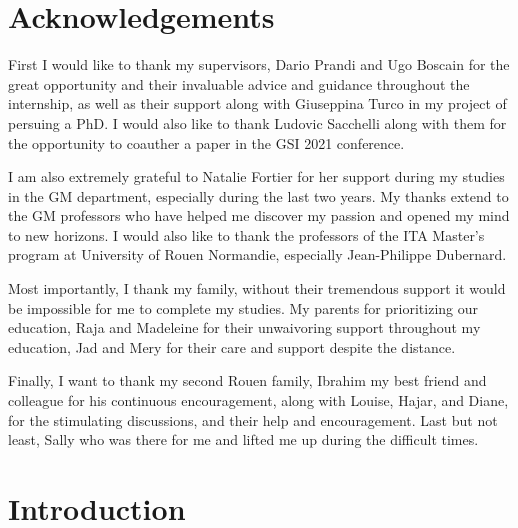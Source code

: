 \documentclass[american,]{article}
\theoremstyle{definition}
\theoremstyle{definition}
\theoremstyle{definition}
\theoremstyle{remark}
\begin{document}
\def\Aut{\mathrm{Aut}}

\def\qtext#1{\quad\text{#1}\quad}

\def\argmin{\mathop{\mathrm{argmin}}}
\def\argmax{\mathop{\mathrm{argmax}}}
\def\supp{\mathop{\mathrm{supp}}}

\def\transp#1{{#1}^{\top}}

\def\stft #1{\mathrm{STFT}\sset{#1}}
\def\STFT{\mathrm{STFT}}
\def\Proj{\mathrm{Proj}}

\def\Cd{\mathrm{Cauchy}}

\pagebreak

\hypertarget{acknowledgements}{%
\section*{Acknowledgements}\label{acknowledgements}}

First I would like to thank my supervisors, Dario Prandi and Ugo Boscain
for the great opportunity and their invaluable advice and guidance throughout the internship,
as well as their support along with Giuseppina Turco in my project of persuing a PhD.
I would also like to thank Ludovic Sacchelli along with them for the opportunity
to coauther a paper in the GSI 2021 conference.

I am also extremely grateful to Natalie Fortier for her support during my studies
in the GM department, especially during the last two years.
My thanks extend to the GM professors who have helped me discover my passion
and opened my mind to new horizons.
I would also like to thank the professors of the ITA Master's program
at University of Rouen Normandie, especially Jean-Philippe Dubernard.

Most importantly, I thank my family, without their tremendous support
it would be impossible for me to complete my studies.
My parents for prioritizing our education, Raja and Madeleine
for their unwaivoring support throughout my education,
Jad and Mery for their care and support despite the distance.

Finally, I want to thank my second Rouen family, Ibrahim
my best friend and colleague for his continuous encouragement,
along with Louise, Hajar, and Diane, for the stimulating discussions,
and their help and encouragement.
Last but not least, Sally who was there for me and lifted me up
during the difficult times.

\pagebreak

\hypertarget{introduction}{%
\section{Introduction}\label{introduction}}
\end{document}
